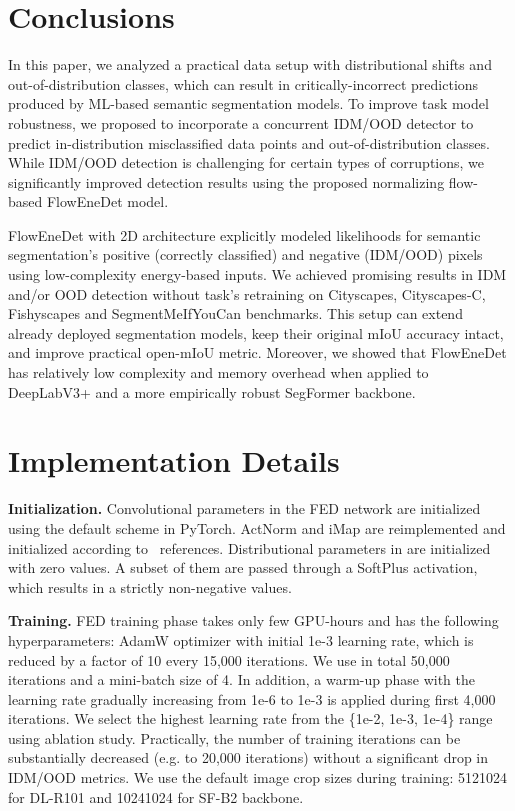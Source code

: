 \documentclass[accepted, startpage]{uai2023}
\newif\ifreport
\begin{document}
\section{Conclusions}
\label{sec:conclusion}
In this paper, we analyzed a practical data setup with distributional shifts and out-of-distribution classes, which can result in critically-incorrect predictions produced by ML-based semantic segmentation models. To improve task model robustness, we proposed to incorporate a concurrent IDM/OOD detector to predict in-distribution misclassified data points and out-of-distribution classes. While IDM/OOD detection is challenging for certain types of corruptions, we significantly improved detection results using the proposed normalizing flow-based FlowEneDet model.

FlowEneDet with 2D architecture explicitly modeled likelihoods for semantic segmentation's positive (correctly classified) and negative (IDM/OOD) pixels using low-complexity energy-based inputs. We achieved promising results in IDM and/or OOD detection without task's retraining on Cityscapes, Cityscapes-C, Fishyscapes and SegmentMeIfYouCan benchmarks. This setup can extend already deployed segmentation models, keep their original mIoU accuracy intact, and improve practical open-mIoU metric. Moreover, we showed that FlowEneDet has relatively low complexity and memory overhead when applied to DeepLabV3+ and a more empirically robust SegFormer backbone.



\newpage
\ifreport
\clearpage{}\appendix

\section{Implementation Details}
\label{subsec:app_hyperparameters}

\textbf{Initialization.} Convolutional parameters in the FED network  are initialized using the default scheme in PyTorch. ActNorm and iMap are reimplemented and initialized according to~\citep{NEURIPS2018_d139db6a, Sukthanker_2022_CVPR} references. Distributional parameters in  are initialized with zero values. A subset of them  are passed through a SoftPlus activation, which results in a strictly non-negative values.

\textbf{Training.} FED training phase takes only few GPU-hours and has the following hyperparameters: AdamW optimizer with initial 1e-3 learning rate, which is reduced by a factor of 10 every 15,000 iterations. We use in total 50,000 iterations and a mini-batch size of 4. In addition, a warm-up phase with the learning rate gradually increasing from 1e-6 to 1e-3 is applied during first 4,000 iterations. We select the highest learning rate from the \{1e-2, 1e-3, 1e-4\} range using ablation study. Practically, the number of training iterations can be substantially decreased (e.g. to 20,000 iterations) without a significant drop in IDM/OOD metrics. We use the default image crop sizes during training: 5121024 for DL-R101 and 10241024 for SF-B2 backbone.
\end{document}

